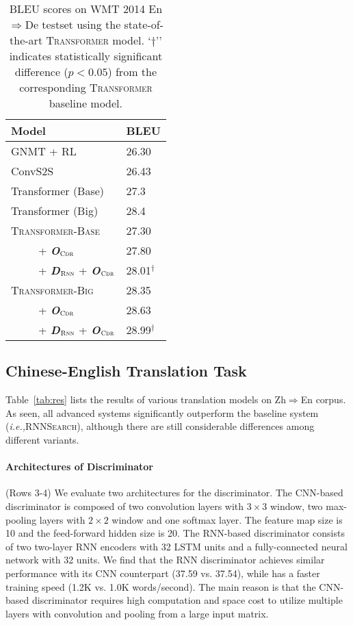 \documentclass[letterpaper]{article} \usepackage{aaai19}  \usepackage{times}  \usepackage{helvet}  \usepackage{courier}  \usepackage{url}  \usepackage{graphicx}  \frenchspacing  \setlength{\pdfpagewidth}{8.5in}  \setlength{\pdfpageheight}{11in}  \usepackage{amsmath}
\begin{document}
\begin{table}[t]
\centering
\small
\begin{tabular}{l|l}
\hline
{\bf Model}  &   {\bf BLEU}    \\
\hline
GNMT + RL \cite{Wu:2016:arXiv}  &  26.30 \\
ConvS2S \cite{gehring2017convolutional}  & 26.43\\
Transformer (Base) \cite{vaswani2017attention}  & 27.3 \\
Transformer (Big) \cite{vaswani2017attention} & 28.4 \\
\hline
  \textsc{Transformer-Base}    &   27.30 \\
~~~~~+ {\bf \em O}$_{\textsc{Cdr}}$ & 27.80 \\
 ~~~~~+ {\bf \em D}$_{\textsc{Rnn}}$ + {\bf \em O}$_{\textsc{Cdr}}$ & 28.01$^{\dag}$  \\\cline{1-2}
\textsc{Transformer-Big}    &   28.35 \\
~~~~~+ {\bf \em O}$_{\textsc{Cdr}}$ & 28.63 \\
~~~~~+ {\bf \em D}$_{\textsc{Rnn}}$ + {\bf \em O}$_{\textsc{Cdr}}$ & 28.99$^{\dag}$  \\
\hline
\end{tabular}
\caption{BLEU scores on WMT 2014 En$\Rightarrow$De testset using the state-of-the-art \textsc{Transformer} model. `$\dag$'' indicates statistically significant difference ($p < 0.05$)  from the corresponding \textsc{Transformer} baseline model.}
\label{tab:res-wmt-att-en-de} 

\end{table}



\subsection{Chinese-English Translation Task}

Table~\ref{tab:res} lists the results of various translation models on Zh$\Rightarrow$En corpus. As seen, all advanced systems significantly outperform the baseline system (\emph{i.e.,}\xspace \textsc{RNNSearch}), although there are still considerable differences among different variants.

\paragraph{\bf Architectures of Discriminator} (Rows 3-4)
We evaluate two architectures for the discriminator. The CNN-based discriminator is composed of two convolution layers with $3\times3$ window, two max-pooling layers with $2\times2$ window and one softmax layer. The feature map size is 10 and the feed-forward hidden size is 20. The RNN-based discriminator consists of two two-layer RNN encoders with 32 LSTM units and a fully-connected neural network with 32 units.
We find that the RNN discriminator achieves similar performance with its CNN counterpart (37.59 vs. 37.54), while has a faster training speed (1.2K vs. 1.0K words/second). 
The main reason is that the CNN-based discriminator requires high computation and space cost to utilize multiple layers with convolution and pooling from a large input matrix. 
\end{document}
